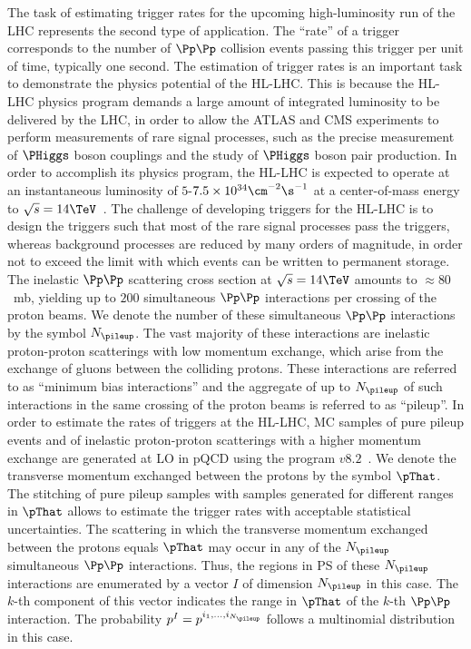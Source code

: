 The task of estimating trigger rates for the upcoming high-luminosity run of the LHC represents the second type of application.
The ``rate'' of a trigger corresponds to the number of $\Pp\Pp$ collision events passing this trigger per unit of time, typically one second.
The estimation of trigger rates is an important task to demonstrate the physics potential of the HL-LHC.
This is because the HL-LHC physics program demands a large amount of integrated luminosity to be delivered by the LHC,
in order to allow the ATLAS and CMS experiments to perform measurements of rare signal processes,
such as the precise measurement of $\PHiggs$ boson couplings and the study of $\PHiggs$ boson pair production.
In order to accomplish its physics program, the HL-LHC is expected to operate at an instantaneous luminosity of $5$-$7.5 \times 10^{34}\cm^{-2}\s^{-1}$
at a center-of-mass energy to $\sqrt{s} = 14\TeV$~\cite{TDR_Phase2_lhc}.
The challenge of developing triggers for the HL-LHC is to design the triggers such that most of the rare signal processes pass the triggers,
whereas background processes are reduced by many orders of magnitude, in order not to exceed the limit with which events can be written to permanent storage.
The inelastic $\Pp\Pp$ scattering cross section at $\sqrt{s} = 14\TeV$ amounts to $\approx 80$~mb,
yielding up to $200$ simultaneous $\Pp\Pp$ interactions per crossing of the proton beams. 
We denote the number of these simultaneous $\Pp\Pp$ interactions by the symbol $N_{\pileup}$.
The vast majority of these interactions are inelastic proton-proton scatterings with low momentum exchange,
which arise from the exchange of gluons between the colliding protons.
These interactions are referred to as ``minimum bias interactions'' and the aggregate of up to $N_{\pileup}$ of such interactions in the same crossing of the proton beams is referred to as ``pileup''.
In order to estimate the rates of triggers at the HL-LHC,
MC samples of pure pileup events and of inelastic proton-proton scatterings with a higher momentum exchange are generated at LO in pQCD
using the program \PYTHIA $v8.2$~\cite{Sjostrand:2014zea}.
We denote the transverse momentum exchanged between the protons by the symbol $\pThat$.
The stitching of pure pileup samples with samples generated for different ranges in $\pThat$ allows to estimate the trigger rates with acceptable statistical uncertainties.
The scattering in which the transverse momentum exchanged between the protons equals $\pThat$ may occur in any of the $N_{\pileup}$ simultaneous $\Pp\Pp$ interactions.
Thus, the regions in PS of these $N_{\pileup}$ interactions are enumerated by a vector $I$ of dimension $N_{\pileup}$ in this case.
The $k$-th component of this vector indicates the range in $\pThat$ of the $k$-th $\Pp\Pp$ interaction.
The probability $p^{I} = p^{i_{1},\dots,i_{N_{\pileup}}}$ follows a multinomial distribution in this case.





